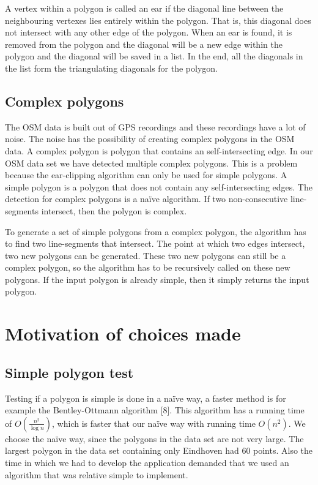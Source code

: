 A vertex within a polygon is called an ear if the diagonal line between the neighbouring vertexes lies entirely within the polygon. That is, this diagonal does not intersect with any other edge of the polygon. When an ear is found, it is removed from the polygon and the diagonal will be a new edge within the polygon and the diagonal will be saved in a list. In the end, all the diagonals in the list form the triangulating diagonals for the polygon.

\subsection{Complex polygons}
\label{subsec:ComplexPolygons}
The OSM data is built out of GPS recordings and these recordings have a lot of noise. The noise has the possibility of creating complex polygons in the OSM data. A complex polygon is polygon that contains an self-intersecting edge. In our OSM data set we have detected multiple complex polygons. This is a problem because the ear-clipping algorithm can only be used for simple polygons. A simple polygon is a polygon that does not contain any self-intersecting edges. The detection for complex polygons is a naïve algorithm. If two non-consecutive line-segments intersect, then the polygon is complex.

To generate a set of simple polygons from a complex polygon, the algorithm has to find two line-segments that intersect. The point at which two edges intersect, two new polygons can be generated. These two new polygons can still be a complex polygon, so the algorithm has to be recursively called on these new polygons. If the input polygon is already simple, then it simply returns the input polygon.

\section{Motivation of choices made}
\label{sec:MotivationOfChoicesMade}
\subsection{Simple polygon test}
\label{subsec:SimplePolygonTest}
Testing if a polygon is simple is done in a naïve way, a faster method is for example the Bentley-Ottmann algorithm [8]. This algorithm has a running time of $O(\frac{n^2}{\log{n}})$, which is faster that our naïve way with running time $O(n^2)$. We choose the naïve way, since the polygons in the data set are not very large. The largest polygon in the data set containing only Eindhoven had 60 points. Also the time in which we had to develop the application demanded that we used an algorithm that was relative simple to implement.

